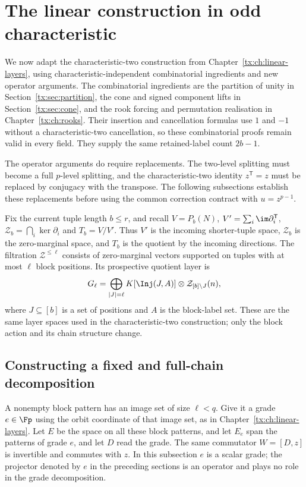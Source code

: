 \section{The linear construction in odd characteristic}\label{tx:sec:oddlinear}
We now adapt the characteristic-two construction from
Chapter~\ref{tx:ch:linear-layers}, using characteristic-independent
combinatorial ingredients and new operator arguments. The combinatorial
ingredients are the partition of unity in Section~\ref{tx:sec:partition}, the cone
and signed component lifts in Section~\ref{tx:sec:cone}, and the
rook forcing and permutation realisation in
Chapter~\ref{tx:ch:rooks}. Their insertion and cancellation formulas
use $1$ and $-1$ without a characteristic-two cancellation, so these
combinatorial proofs remain valid in every field. They supply
the same retained-label count $2b-1$.

The operator arguments do require replacements. The two-level
splitting must become a full $p$-level splitting, and the
characteristic-two identity $z^{\mathsf T}=z$ must be replaced by
conjugacy with the transpose. The following subsections establish
these replacements before using the common correction contract
with $u=z^{p-1}$.

Fix the current tuple length $b\le r$, and recall
$V=P_b(N)$, $V'=\sum_i\im\partial_i^{\mathsf T}$,
$\mathcal Z_b=\bigcap_i\ker\partial_i$ and $T_b=V/V'$.
Thus $V'$ is the incoming shorter-tuple space, $\mathcal Z_b$ is
the zero-marginal space, and $T_b$ is the quotient by the incoming
directions. The filtration $\mathcal Z^{\le\ell}$ consists of
zero-marginal vectors supported on tuples with at most $\ell$ block
positions. Its prospective quotient layer
is
\[
G_\ell=\bigoplus_{|J|=\ell}
       K[\Inj(J,A)]\otimes\mathcal Z_{[b]\setminus J}(n),
\]
where $J\subseteq[b]$ is a set of positions and $A$ is the block-label set.
These are the same layer spaces used in the characteristic-two
construction; only the block action and its chain structure change.

\subsection{Constructing a fixed and full-chain decomposition}
A nonempty block pattern has an image set of size $\ell<q$.
Give it a grade $e\in\Fp$ using the orbit coordinate of that image
set, as in Chapter~\ref{tx:ch:linear-layers}. Let $E$ be the space on
all these block patterns, and let $E_e$ span the
patterns of grade $e$, and let $D$ read the grade. The same commutator
$W=[D,z]$ is invertible and commutes with $z$.
In this subsection $e$ is a scalar grade; the projector denoted by
$e$ in the preceding sections is an operator and plays no role in
the grade decomposition.

